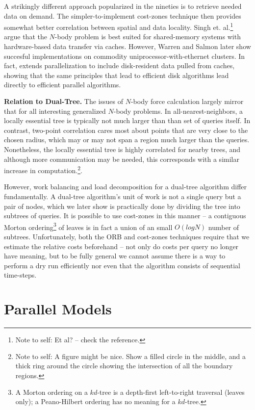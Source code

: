 \documentclass[times, leqno,twocolumn]{article}
\newcommand{\authornote}[1]{\footnote{Note to self: #1}}
\begin{document}
A strikingly different approach popularized in the nineties is to retrieve needed data on demand.
The simpler-to-implement cost-zones technique then provides somewhat better correlation between spatial and data locality.
Singh et. al.\authornote{Et al? -- check the reference.} \cite{singh95load, singh_architecture} argue that the $N$-body problem is best suited for shared-memory systems with hardware-based data transfer via caches.
However, Warren and Salmon later \cite{warren93,warren97} show succesful implementations on commodity uniprocessor-with-ethernet clusters.
In fact, \cite{warren97} extends parallelization to include disk-resident data pulled from caches, showing that the same principles that lead to efficient disk algorithms lead directly to efficient parallel algorithms.

{\bf Relation to Dual-Tree.}
The issues of $N$-body force calculation largely mirror that for all interesting generalized $N$-body problems.
In all-nearest-neighbors, a locally essential tree is typically not much larger than than set of queries itself.
In contrast, two-point correlation cares most about points that are very close to the chosen radius, which may or may not span a region much larger than the queries.
Nonetheless, the locally essential tree is highly correlated for nearby trees, and although more communication may be needed, this corresponds with a similar increase in computation.\authornote{A figure might be nice.  Show a filled circle in the middle, and a thick ring around the circle showing the intersection of all the boundary regions.}.

However, work balancing and load decomposition for a dual-tree algorithm differ fundamentally.
A dual-tree algorithm's unit of work is not a single query but a pair of nodes, which we later show is practically done by dividing the tree into subtrees of queries.
It is possible to use cost-zones in this manner -- a contiguous Morton ordering\footnote{A Morton ordering on a $kd$-tree is a depth-first left-to-right traversal (leaves only); a Peano-Hilbert ordering has no meaning for a $kd$-tree.} of leaves is in fact a union of an small $O(log N)$ number of subtrees.
Unfortunately, both the ORB and cost-zones techniques require that we estimate the relative costs beforehand -- not only do costs per query no longer have meaning, but to be fully general we cannot assume there is a way to perform a dry run efficiently nor even that the algorithm consists of sequential time-steps.

\section{Parallel Models}
\end{document}
